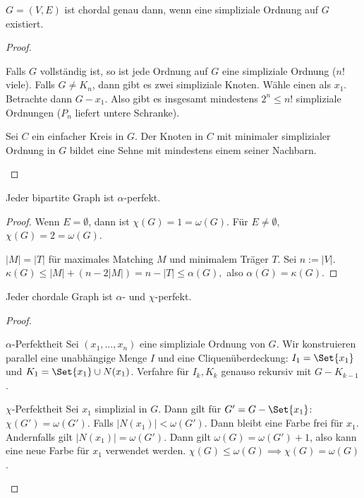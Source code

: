 \begin{st}
    $G = (V, E)$ ist chordal genau dann, wenn eine simpliziale Ordnung auf $G$ existiert.
    \begin{proof}
        \begin{seg}{\ProofImplication}
            Falls $G$ vollständig ist, so ist jede Ordnung auf $G$ eine simpliziale Ordnung ($n!$ viele).
            Falls $G \neq K_n$, dann gibt es zwei simpliziale Knoten.
            Wähle einen als $x_1$.
            Betrachte dann $G - x_1$.
            Also gibt es insgesamt mindestens $2^n \le n!$ simpliziale Ordnungen ($P_n$ liefert untere Schranke).
        \end{seg}
        \begin{seg}{\ProofImplication*}
            Sei $C$ ein einfacher Kreis in $G$.
            Der Knoten in $C$ mit minimaler simplizialer Ordnung in $G$ bildet eine Sehne mit mindestens einem seiner Nachbarn.
        \end{seg}
    \end{proof}
\end{st}

\begin{st}
    Jeder bipartite Graph ist $\alpha$-perfekt.
    \begin{proof}
        Wenn $E = \emptyset$, dann ist $\chi(G) = 1 = \omega(G)$.
        Für $E \neq \emptyset$, $\chi(G) = 2 = \omega(G)$.

        $|M| = |T|$ für maximales Matching $M$ und minimalem Träger $T$.
        Sei $n := |V|$.
        \begin{math}
            \kappa(G) \le |M| + (n - 2 |M|)
            = n - |T|
            \le \alpha(G),
        \end{math}
        also $\alpha(G) = \kappa(G)$.
    \end{proof}
\end{st}

\begin{st}
    Jeder chordale Graph ist $\alpha$- und $\chi$-perfekt.
    \begin{proof}
        \begin{seg}{$\alpha$-Perfektheit}
            Sei $(x_1, \dotsc, x_n)$ eine simpliziale Ordnung von $G$.
            Wir konstruieren parallel eine unabhängige Menge $I$ und eine Cliquenüberdeckung: $I_1 = \Set{x_1}$ und $K_1 = \Set{x_1} \cup N(x_1)$.
            Verfahre für $I_k, K_k$ genauso rekursiv mit $G - K_{k-1}$.
        \end{seg}
        \begin{seg}{$\chi$-Perfektheit}
            Sei $x_1$ simplizial in $G$.
            Dann gilt für $G' = G - \Set{x_1}$: $\chi(G') = \omega(G')$.
            Falls $|N(x_1)| < \omega(G')$.
            Dann bleibt eine Farbe frei für $x_1$.
            Andernfalls gilt $|N(x_1)| = \omega(G')$.
            Dann gilt $\omega(G) = \omega(G') + 1$, also kann eine neue Farbe für $x_1$ verwendet werden.
            $\chi(G) \le \omega(G) \implies \chi(G) = \omega(G)$.
        \end{seg}
    \end{proof}
\end{st}



